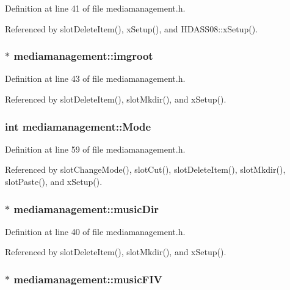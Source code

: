 Definition at line 41 of file mediamanagement.h.

Referenced by slot\-Delete\-Item(), x\-Setup(), and HDASS08::x\-Setup().
\subsubsection{ $\ast$ {\bf mediamanagement::imgroot}}\label{classmediamanagement_mediamanagemento5}




Definition at line 43 of file mediamanagement.h.

Referenced by slot\-Delete\-Item(), slot\-Mkdir(), and x\-Setup().
\subsubsection{\setlength{\rightskip}{0pt plus 5cm}int {\bf mediamanagement::Mode}\hspace{0.3cm}{\tt  [private]}}\label{classmediamanagement_mediamanagementr2}




Definition at line 59 of file mediamanagement.h.

Referenced by slot\-Change\-Mode(), slot\-Cut(), slot\-Delete\-Item(), slot\-Mkdir(), slot\-Paste(), and x\-Setup().
\subsubsection{$\ast$ {\bf mediamanagement::music\-Dir}}\label{classmediamanagement_mediamanagemento1}




Definition at line 40 of file mediamanagement.h.

Referenced by slot\-Delete\-Item(), slot\-Mkdir(), and x\-Setup().
\subsubsection{$\ast$ {\bf mediamanagement::music\-FIV}}\label{classmediamanagement_mediamanagemento3}




